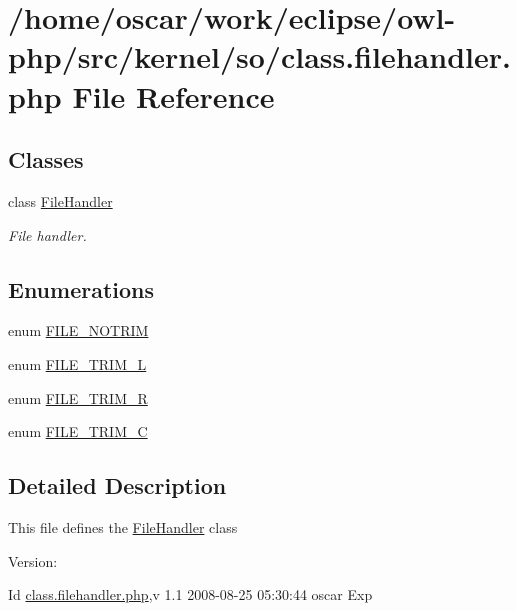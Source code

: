 \hypertarget{class_8filehandler_8php}{
\section{/home/oscar/work/eclipse/owl-php/src/kernel/so/class.filehandler.php File Reference}
\label{class_8filehandler_8php}
}
\subsection*{Classes}
\begin{CompactItemize}
\item 
class \hyperlink{classFileHandler}{FileHandler}
\begin{CompactList}\small\item\em File handler. \item\end{CompactList}\end{CompactItemize}
\subsection*{Enumerations}
\begin{CompactItemize}
\item 
enum \hyperlink{class_8filehandler_8php_3720f2e15eb9e16e29d8ecbb96763662}{FILE\_\-NOTRIM} 
\item 
enum \hyperlink{class_8filehandler_8php_080de95fd7cf2e8d8ac78ac7ad9471ee}{FILE\_\-TRIM\_\-L} 
\item 
enum \hyperlink{class_8filehandler_8php_7ee25ec88036b90f5a0ae8be7bc41769}{FILE\_\-TRIM\_\-R} 
\item 
enum \hyperlink{class_8filehandler_8php_2787c3a1ecef8697c863800d0b2848a4}{FILE\_\-TRIM\_\-C} 
\end{CompactItemize}


\subsection{Detailed Description}
This file defines the \hyperlink{classFileHandler}{FileHandler} class \begin{Desc}
\item[Version:]\end{Desc}
\begin{Desc}
\item[Id]\hyperlink{class_8filehandler_8php}{class.filehandler.php},v 1.1 2008-08-25 05:30:44 oscar Exp \end{Desc}


